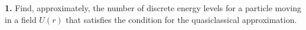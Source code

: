 \textbf{1.} Find, approximately, the number of discrete energy levels for a
particle moving in a field $U(r)$ that satisfies the condition for the
quasiclassical approximation.
